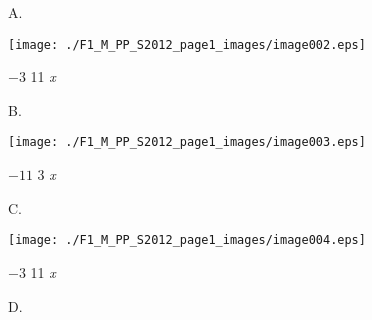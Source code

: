 \documentclass[a4paper,12pt]{article}
\begin{document}
A.
\begin{center}
\texttt{[image: ./F1\_M\_PP\_S2012\_page1\_images/image002.eps]}
\end{center}
$-3$  11  {\it x}

B.
\begin{center}
\texttt{[image: ./F1\_M\_PP\_S2012\_page1\_images/image003.eps]}
\end{center}
$-11$  3  {\it x}

C.
\begin{center}
\texttt{[image: ./F1\_M\_PP\_S2012\_page1\_images/image004.eps]}
\end{center}
$-3$  11  {\it x}

D.
\end{document}
